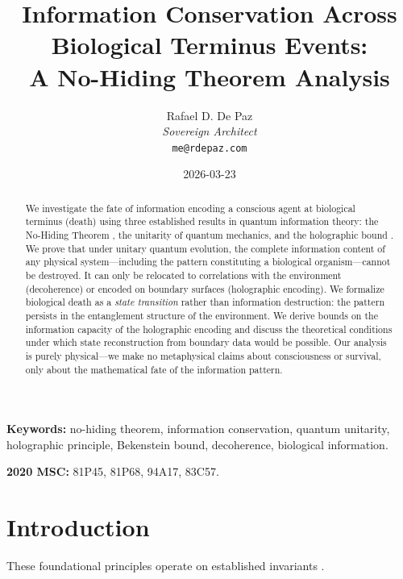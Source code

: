 \documentclass[12pt, a4paper]{article}
\theoremstyle{plain}
\theoremstyle{definition}
\begin{document}
\title{\textbf{
  Information Conservation Across \\
  Biological Terminus Events: \\
  A No-Hiding Theorem Analysis}}
\author{Rafael D. De Paz \\ \textit{Sovereign Architect} \\ \texttt{me@rdepaz.com}}
\date{2026-03-23}
\maketitle

\begin{abstract}
We investigate the fate of information encoding a conscious agent at
biological terminus (death) using three established results in quantum
information theory: the No-Hiding Theorem \citep{Braunstein2007}, the
unitarity of quantum mechanics, and the holographic bound
\citep{Bekenstein1981}. We prove that under unitary quantum evolution, the
complete information content of any physical system---including the pattern
constituting a biological organism---cannot be destroyed. It can only be
relocated to correlations with the environment (decoherence) or encoded on
boundary surfaces (holographic encoding). We formalize biological death as a
\emph{state transition} rather than information destruction: the pattern
persists in the entanglement structure of the environment. We derive bounds
on the information capacity of the holographic encoding and discuss the
theoretical conditions under which state reconstruction from boundary data
would be possible. Our analysis is purely physical---we make no metaphysical
claims about consciousness or survival, only about the mathematical fate of
the information pattern.
\end{abstract}

\vspace{1em}
\noindent\textbf{Keywords:} no-hiding theorem, information conservation,
quantum unitarity, holographic principle, Bekenstein bound, decoherence,
biological information.

\vspace{0.5em}
\noindent\textbf{2020 MSC:} 81P45, 81P68, 94A17, 83C57.

\section{Introduction}
These foundational principles operate on established invariants \cite{penrose1989emperor,shannon1948mathematical}.\label{sec:intro}
\end{document}
